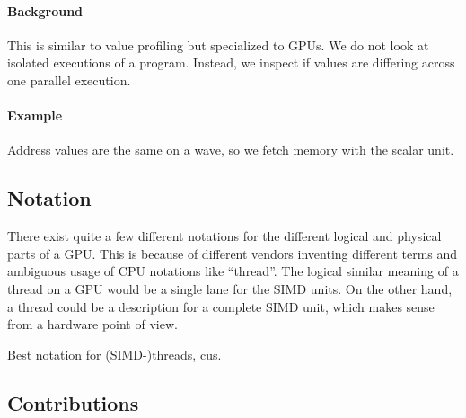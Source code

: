 \paragraph{Background} This is similar to value profiling but specialized to GPUs. We do not look at isolated executions of a program. Instead, we inspect if values are differing across one parallel execution.
\paragraph{Example} Address values are the same on a wave, so we fetch memory with the scalar unit.

\subsection{Notation}
\label{sub:notation}
There exist quite a few different notations for the different logical and physical parts of a GPU. This is because of different vendors inventing different terms and ambiguous usage of CPU notations like \enquote{thread}. The logical similar meaning of a thread on a GPU would be a single lane for the SIMD units. On the other hand, a thread could be a description for a complete SIMD unit, which makes sense from a hardware point of view.



Best notation for (SIMD-)threads, \glspl{cu}.

\subsection{Contributions}
\label{sub:contributions}

